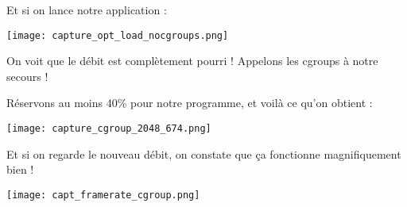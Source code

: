 Et si on lance notre application :

\begin{center} 
\hspace{12.45cm}
\texttt{[image: capture\_opt\_load\_nocgroups.png]}
\end{center}
\vspace{0.5cm}

On voit que le débit est complètement pourri ! Appelons les cgroups à notre secours !

\pagebreak 

Réservons au moins 40\% pour notre programme, et voilà ce qu'on obtient :

\begin{center} 
\hspace{12.45cm}
\texttt{[image: capture\_cgroup\_2048\_674.png]}
\end{center}
\vspace{0.5cm}

Et si on regarde le nouveau débit, on constate que ça fonctionne magnifiquement bien !

\begin{center} 
\hspace{12.45cm}
\texttt{[image: capt\_framerate\_cgroup.png]}
\end{center}
\vspace{0.5cm}
